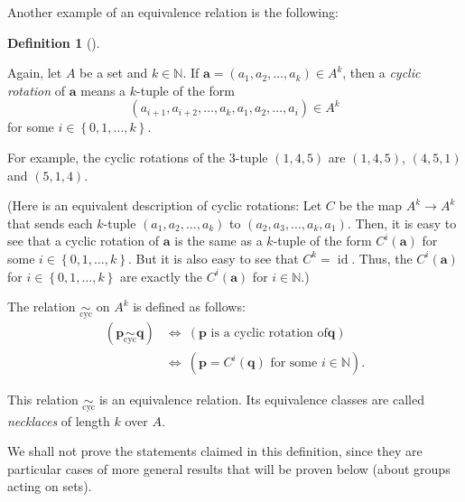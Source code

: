\documentclass[numbers=enddot,12pt,final,onecolumn,notitlepage]{scrartcl}%
\numberwithin{exer}{subsection}
\theoremstyle{definition}
\newtheorem{defi}[theo]{Definition}
\newenvironment{definition}[1][]
{\begin{defi}[#1]\begin{leftbar}}
{\end{leftbar}\end{defi}}
\begin{document}
Another example of an equivalence relation is the following:

\begin{definition}
\label{def.eqrel.eqcl.cyc}Again, let $A$ be a set and $k\in\mathbb{N}$. If
$\mathbf{a}=\left(  a_{1},a_{2},\ldots,a_{k}\right)  \in A^{k}$, then a
\textit{cyclic rotation} of $\mathbf{a}$ means a $k$-tuple of the form%
\[
\left(  a_{i+1},a_{i+2},\ldots,a_{k},a_{1},a_{2},\ldots,a_{i}\right)  \in
A^{k}%
\]
for some $i\in\left\{  0,1,\ldots,k\right\}  $.

For example, the cyclic rotations of the $3$-tuple $\left(  1,4,5\right)  $
are $\left(  1,4,5\right)  $, $\left(  4,5,1\right)  $ and $\left(
5,1,4\right)  $.

(Here is an equivalent description of cyclic rotations: Let $C$ be the map
$A^{k}\rightarrow A^{k}$ that sends each $k$-tuple $\left(  a_{1},a_{2}%
,\ldots,a_{k}\right)  $ to $\left(  a_{2},a_{3},\ldots,a_{k},a_{1}\right)  $.
Then, it is easy to see that a cyclic rotation of $\mathbf{a}$ is the same as
a $k$-tuple of the form $C^{i}\left(  \mathbf{a}\right)  $ for some
$i\in\left\{  0,1,\ldots,k\right\}  $. But it is also easy to see that
$C^{k}=\operatorname*{id}$. Thus, the $C^{i}\left(  \mathbf{a}\right)  $ for
$i\in\left\{  0,1,\ldots,k\right\}  $ are exactly the $C^{i}\left(
\mathbf{a}\right)  $ for $i\in\mathbb{N}$.)

The relation $\underset{\operatorname*{cyc}}{\sim}$ on $A^{k}$ is defined as
follows:%
\begin{align*}
\left(  \mathbf{p}\underset{\operatorname*{cyc}}{\sim}\mathbf{q}\right)   &
\Longleftrightarrow\ \left(  \mathbf{p}\text{ is a cyclic rotation of
}\mathbf{q}\right) \\
&  \Longleftrightarrow\ \left(  \mathbf{p}=C^{i}\left(  \mathbf{q}\right)
\text{ for some }i\in\mathbb{N}\right)  .
\end{align*}


This relation $\underset{\operatorname*{cyc}}{\sim}$ is an equivalence
relation. Its equivalence classes are called \textit{necklaces} of length $k$
over $A$.
\end{definition}

We shall not prove the statements claimed in this definition, since they are
particular cases of more general results that will be proven below (about
groups acting on sets).
\end{document}

